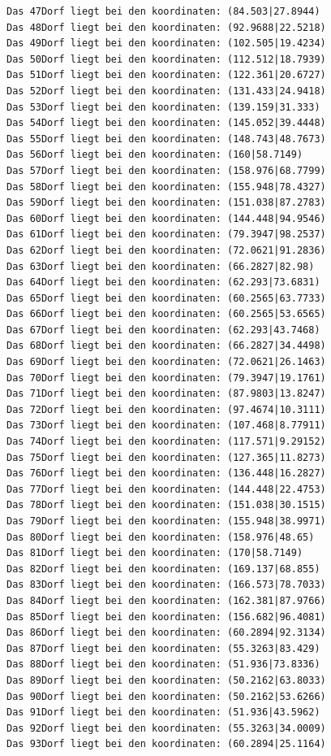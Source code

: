 \documentclass{article}
\begin{document}
\begin{verbatim}
Das 47Dorf liegt bei den koordinaten: (84.503|27.8944)
Das 48Dorf liegt bei den koordinaten: (92.9688|22.5218)
Das 49Dorf liegt bei den koordinaten: (102.505|19.4234)
Das 50Dorf liegt bei den koordinaten: (112.512|18.7939)
Das 51Dorf liegt bei den koordinaten: (122.361|20.6727)
Das 52Dorf liegt bei den koordinaten: (131.433|24.9418)
Das 53Dorf liegt bei den koordinaten: (139.159|31.333)
Das 54Dorf liegt bei den koordinaten: (145.052|39.4448)
Das 55Dorf liegt bei den koordinaten: (148.743|48.7673)
Das 56Dorf liegt bei den koordinaten: (160|58.7149)
Das 57Dorf liegt bei den koordinaten: (158.976|68.7799)
Das 58Dorf liegt bei den koordinaten: (155.948|78.4327)
Das 59Dorf liegt bei den koordinaten: (151.038|87.2783)
Das 60Dorf liegt bei den koordinaten: (144.448|94.9546)
Das 61Dorf liegt bei den koordinaten: (79.3947|98.2537)
Das 62Dorf liegt bei den koordinaten: (72.0621|91.2836)
Das 63Dorf liegt bei den koordinaten: (66.2827|82.98)
Das 64Dorf liegt bei den koordinaten: (62.293|73.6831)
Das 65Dorf liegt bei den koordinaten: (60.2565|63.7733)
Das 66Dorf liegt bei den koordinaten: (60.2565|53.6565)
Das 67Dorf liegt bei den koordinaten: (62.293|43.7468)
Das 68Dorf liegt bei den koordinaten: (66.2827|34.4498)
Das 69Dorf liegt bei den koordinaten: (72.0621|26.1463)
Das 70Dorf liegt bei den koordinaten: (79.3947|19.1761)
Das 71Dorf liegt bei den koordinaten: (87.9803|13.8247)
Das 72Dorf liegt bei den koordinaten: (97.4674|10.3111)
Das 73Dorf liegt bei den koordinaten: (107.468|8.77911)
Das 74Dorf liegt bei den koordinaten: (117.571|9.29152)
Das 75Dorf liegt bei den koordinaten: (127.365|11.8273)
Das 76Dorf liegt bei den koordinaten: (136.448|16.2827)
Das 77Dorf liegt bei den koordinaten: (144.448|22.4753)
Das 78Dorf liegt bei den koordinaten: (151.038|30.1515)
Das 79Dorf liegt bei den koordinaten: (155.948|38.9971)
Das 80Dorf liegt bei den koordinaten: (158.976|48.65)
Das 81Dorf liegt bei den koordinaten: (170|58.7149)
Das 82Dorf liegt bei den koordinaten: (169.137|68.855)
Das 83Dorf liegt bei den koordinaten: (166.573|78.7033)
Das 84Dorf liegt bei den koordinaten: (162.381|87.9766)
Das 85Dorf liegt bei den koordinaten: (156.682|96.4081)
Das 86Dorf liegt bei den koordinaten: (60.2894|92.3134)
Das 87Dorf liegt bei den koordinaten: (55.3263|83.429)
Das 88Dorf liegt bei den koordinaten: (51.936|73.8336)
Das 89Dorf liegt bei den koordinaten: (50.2162|63.8033)
Das 90Dorf liegt bei den koordinaten: (50.2162|53.6266)
Das 91Dorf liegt bei den koordinaten: (51.936|43.5962)
Das 92Dorf liegt bei den koordinaten: (55.3263|34.0009)
Das 93Dorf liegt bei den koordinaten: (60.2894|25.1164)

\end{verbatim}
\end{document}
